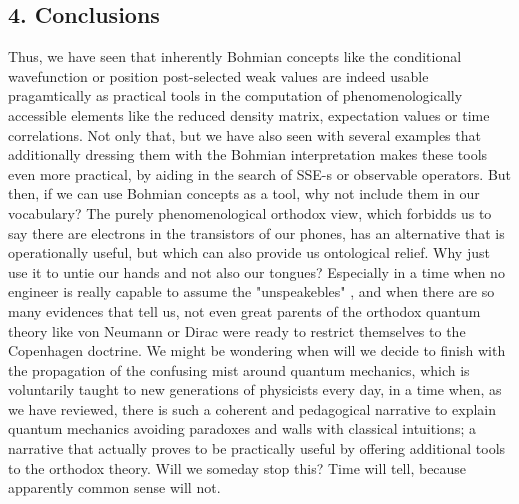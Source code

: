 \documentclass[11pt, a4paper]{article} %
\begin{document}
\subsection*{4. Conclusions}\vspace{-0.15cm}
Thus, we have seen that inherently Bohmian concepts like the conditional wavefunction or position post-selected weak values are indeed usable pragamtically as practical tools in the computation of phenomenologically accessible elements like the reduced density matrix, expectation values or time correlations. Not only that, but we have also seen with several examples that additionally dressing them with the Bohmian interpretation makes these tools even more practical, by aiding in the search of SSE-s or observable operators. But then, if we can use Bohmian concepts as a tool, why not include them in our vocabulary? The purely phenomenological orthodox view, which forbidds us to say there are electrons in the transistors of our phones, has an alternative that is operationally useful, but which can also provide us ontological relief. Why just use it to untie our hands and not also our tongues? Especially in a time when no engineer is really capable to assume the "unspeakebles" \cite{where}, and when there are so many evidences that tell us, not even great parents of the orthodox quantum theory like von Neumann \cite{NeumannNoCollapse} or Dirac \cite{Dirac} were ready to restrict themselves to the Copenhagen doctrine. We might be wondering when will we decide to finish with the propagation of the confusing mist around quantum mechanics, which is voluntarily taught to new generations of physicists every day, in a time when, as we have reviewed, there is such a coherent and pedagogical narrative to explain quantum mechanics avoiding paradoxes and walls with classical intuitions; a narrative that actually proves to be practically useful by offering additional tools to the orthodox theory. Will we someday stop this? Time will tell, because apparently common sense will not.
\end{document}
